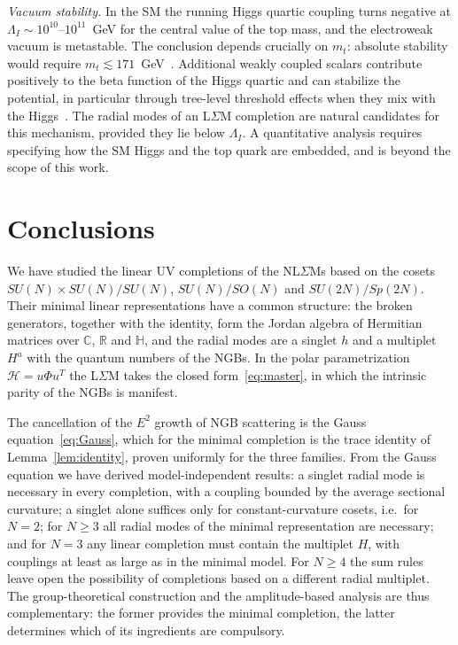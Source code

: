 \documentclass[aps,prd,twocolumn,superscriptaddress,nofootinbib,floatfix]{revtex4-2}
\theoremstyle{remark}
\newcommand{\Hf}{\mathcal{H}}      %
\newcommand{\ie}{i.e.}
\begin{document}
\emph{Vacuum stability.} In the SM the running Higgs quartic coupling turns negative at $\Lambda_I\sim10^{10}$--$10^{11}$~GeV for the central value of the top mass, and the electroweak vacuum is metastable. The conclusion depends crucially on $m_t$: absolute stability would require $m_t\lesssim171$~GeV~\cite{Sher:1988mj,Degrassi:2012ry,Buttazzo:2013uya}. Additional weakly coupled scalars contribute positively to the beta function of the Higgs quartic and can stabilize the potential, in particular through tree-level threshold effects when they mix with the Higgs~\cite{Elias-Miro:2012eoi,Lebedev:2012zw}. The radial modes of an L$\Sigma$M completion are natural candidates for this mechanism, provided they lie below $\Lambda_I$. A quantitative analysis requires specifying how the SM Higgs and the top quark are embedded, and is beyond the scope of this work.

\section{Conclusions}
\label{sec:conclusions}

We have studied the linear UV completions of the NL$\Sigma$Ms based on the cosets $SU(N)\times SU(N)/SU(N)$, $SU(N)/SO(N)$ and $SU(2N)/Sp(2N)$. Their minimal linear representations have a common structure: the broken generators, together with the identity, form the Jordan algebra of Hermitian matrices over $\mathbb{C}$, $\mathbb{R}$ and $\mathbb{H}$, and the radial modes are a singlet $h$ and a multiplet $H^a$ with the quantum numbers of the NGBs. In the polar parametrization $\Hf=u\Phi u^T$ the L$\Sigma$M takes the closed form~\eqref{eq:master}, in which the intrinsic parity of the NGBs is manifest.

The cancellation of the $E^2$ growth of NGB scattering is the Gauss equation~\eqref{eq:Gauss}, which for the minimal completion is the trace identity of Lemma~\ref{lem:identity}, proven uniformly for the three families. From the Gauss equation we have derived model-independent results: a singlet radial mode is necessary in every completion, with a coupling bounded by the average sectional curvature; a singlet alone suffices only for constant-curvature cosets, \ie\ for $N=2$; for $N\ge3$ all radial modes of the minimal representation are necessary; and for $N=3$ any linear completion must contain the multiplet $H$, with couplings at least as large as in the minimal model. For $N\ge4$ the sum rules leave open the possibility of completions based on a different radial multiplet. The group-theoretical construction and the amplitude-based analysis are thus complementary: the former provides the minimal completion, the latter determines which of its ingredients are compulsory.
\end{document}
